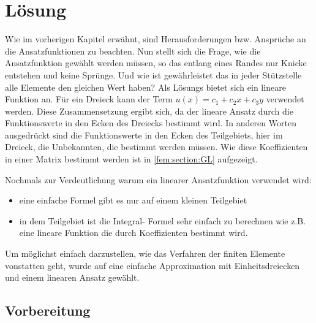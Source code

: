 %
%
%
\section{Lösung
\label{fem:section:loesung}}
Wie im vorherigen Kapitel erwähnt, sind Herausforderungen bzw. Ansprüche an die Ansatzfunktionen zu beachten. Nun stellt sich die Frage, wie die Ansatzfunktion gewählt werden müssen, so das entlang eines Randes nur \frqq Knicke \flqq entstehen und keine Sprünge. Und wie ist gewährleistet das in jeder Stützstelle alle Elemente den gleichen Wert haben?  Als Lösungs bietet sich ein lineare Funktion an. Für ein Dreieck kann der Term $u(x) = c_1 + c_2x + c_3y$ verwendet werden. Diese Zusammensetzung ergibt sich, da der lineare Ansatz durch die Funktionswerte in den Ecken des Dreiecks bestimmt wird. In anderen Worten ausgedrückt sind die Funktionswerte in den Ecken des Teilgebiets, hier im Dreieck, die Unbekannten, die bestimmt werden müssen. Wie diese Koeffizienten in einer Matrix bestimmt werden ist in \ref{fem:section:GL} aufgezeigt.

Nochmals zur Verdeutlichung warum ein linearer Ansatzfunktion verwendet wird:
\begin{itemize}
	\item eine einfache Formel gibt es nur auf einem kleinen Teilgebiet
	\item in dem Teilgebiet ist die Integral- Formel sehr einfach zu berechnen wie z.B. eine lineare Funktion die durch Koeffizienten bestimmt wird.
\end{itemize}
Um möglichst einfach darzustellen, wie das Verfahren der finiten Elemente vonstatten geht, wurde auf eine einfache Approximation mit Einheitsdreiecken und einem linearen Ansatz gewählt. 

\subsection{Vorbereitung
\label{fem:section:loesungTrans}}

